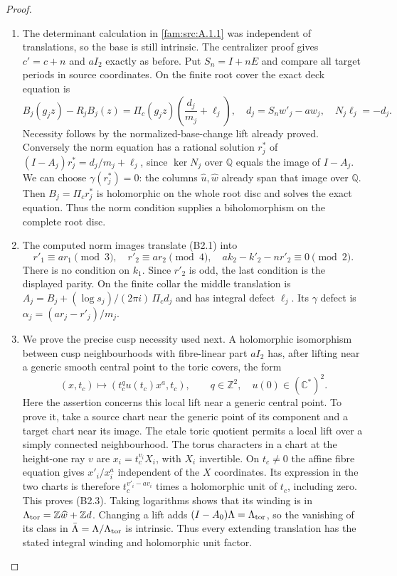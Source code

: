 \begin{proof}
\begin{enumerate}[label=\arabic*.,leftmargin=*]
\item The determinant calculation in \ref{fam:src:A.1.1} was independent of translations, so the base is still intrinsic. The centralizer proof gives $c'=c+n$ and $aI_2$ exactly as before. Put $S_n=I+nE$ and compare all target periods in source coordinates. On the finite root cover the exact deck equation is
\[
 B_j(g_jz)-R_jB_j(z)=\Pi_c(g_jz)\left(\frac{d_j}{m_j}+\ell_j\right),
 \quad d_j=S_nw'_j-a w_j,
 \quad N_j\ell_j=-d_j.                                      \tag{B2.1}
\]
Necessity follows by the normalized-base-change lift already proved. Conversely the norm equation has a rational solution $r_j^*$ of
$(I-A_j)r_j^*=d_j/m_j+\ell_j$, since $\ker N_j$ over $\mathbb Q$ equals the image of $I-A_j$. We can choose $\gamma(r_j^*)=0$: the columns $\widehat u,\widehat w$ already span that image over $\mathbb Q$. Then $B_j=\Pi_cr_j^*$ is holomorphic on the whole root disc and solves the exact equation. Thus the norm condition supplies a biholomorphism on the complete root disc.

\item The computed norm images translate (B2.1) into
\[
 r'_1\equiv ar_1\pmod3,\quad r'_2\equiv ar_2\pmod4,
 \quad ak_2-k'_2-nr'_2\equiv0\pmod2.                       \tag{B2.2}
\]
There is no condition on $k_1$. Since $r'_2$ is odd, the last condition is the displayed parity. On the finite collar the middle translation is
$A_j=B_j+(\log s_j)/(2\pi i)\,\Pi_cd_j$ and has integral defect $\ell_j$. Its $\gamma$ defect is
$\alpha_j=(ar_j-r'_j)/m_j$.

\item We prove the precise cusp necessity used next. A holomorphic isomorphism between cusp neighbourhoods with fibre-linear part $aI_2$ has, after lifting near a generic smooth central point to the toric covers, the form
\[
 (x,t_c)\longmapsto(t_c^q u(t_c)x^a,t_c),\qquad q\in\mathbb Z^2,
 \quad u(0)\in(\mathbb C^*)^2.                           \tag{B2.3}
\]
Here the assertion concerns this local lift near a generic central point. To prove it, take a source chart near the generic point of its component and a target chart near its image. The etale toric quotient permits a local lift over a simply connected neighbourhood. The torus characters in a chart at the height-one ray $v$ are $x_i=t_c^{v_i}X_i$, with $X_i$ invertible. On $t_c\ne0$ the affine fibre equation gives $x'_i/x_i^a$ independent of the $X$ coordinates. Its expression in the two charts is therefore $t_c^{v'_i-av_i}$ times a holomorphic unit of $t_c$, including zero. This proves (B2.3). Taking logarithms shows that its winding is in $\Lambda_{\rm tor}=\mathbb Z\widehat w+\mathbb Zd$. Changing a lift adds $(I-A_0)\Lambda=\Lambda_{\rm tor}$, so the vanishing of its class in $\bar\Lambda=\Lambda/\Lambda_{\rm tor}$ is intrinsic. Thus every extending translation has the stated integral winding and holomorphic unit factor.


\end{enumerate}
\end{proof}
